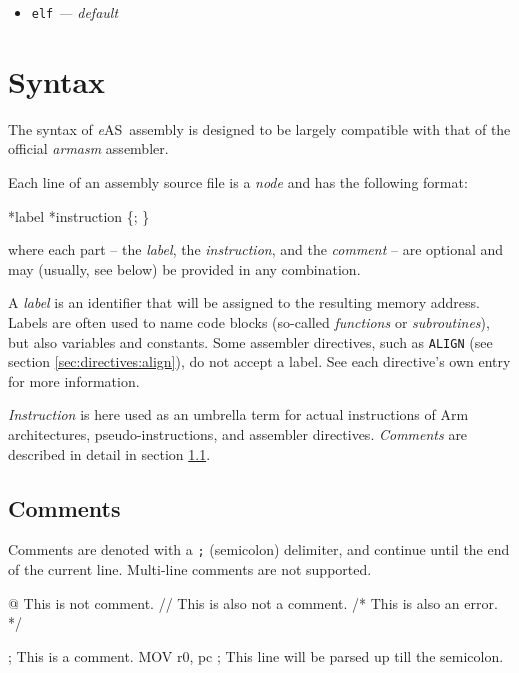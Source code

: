 \documentclass[a4paper]{article}
\makeatletter
\newcommand*{\eAS}{\textup{\textit{e}AS}}
\newcommand*{\@usagevalue}[1]{\textit{<#1>}}
\newcommand*{\@usagevaluestar}[1]{\{\textit{<#1>}\}}
\newcommand*{\usagevalue}{\@ifstar{\@usagevaluestar}{\@usagevalue}}
\newenvironment{codeblock}{\mdframed\verbatim}{\endverbatim\endmdframed}
\makeatother
\begin{document}
			\begin{itemize}
				\item \texttt{elf} \textit{--- default}
			\end{itemize}

	\clearpage
	\section{Syntax}
		\label{sec:syntax}
		The syntax of \eAS\ assembly is designed to be largely compatible with that of the official \textit{armasm} assembler.

		Each line of an assembly source file is a \textit{node} and has the following format:

		\begin{center}
			\begin{varwidth}{\textwidth}
				\ttfamily
				\usagevalue*{label} \usagevalue*{instruction} \{; \usagevalue{comment}\}
			\end{varwidth}
		\end{center}

		where each part -- the \textit{label}, the \textit{instruction}, and the \textit{comment} -- are optional and may (usually, see below) be provided in any combination.

		A \textit{label} is an identifier that will be assigned to the resulting memory address.
		Labels are often used to name code blocks (so-called \textit{functions} or \textit{subroutines}), but also variables and constants.
		Some assembler directives, such as \texttt{ALIGN} (see section \ref{sec:directives:align}), do not accept a label.
		See each directive's own entry for more information.

		\textit{Instruction} is here used as an umbrella term for actual instructions of Arm architectures, pseudo-instructions, and assembler directives.
		\textit{Comments} are described in detail in section \ref{sec:syntax:comments}.

		\subsection{Comments}
			\label{sec:syntax:comments}
			Comments are denoted with a \texttt{;} (semicolon) delimiter, and continue until the end of the current line.
			Multi-line comments are not supported.

			\begin{codeblock}
				           @  This is not comment.
				           // This is also not a comment.
				           /*
				              This is also an error.
				           */

				           ; This is a comment.
				MOV r0, pc ; This line will be parsed up till the semicolon.
			\end{codeblock}
\end{document}
